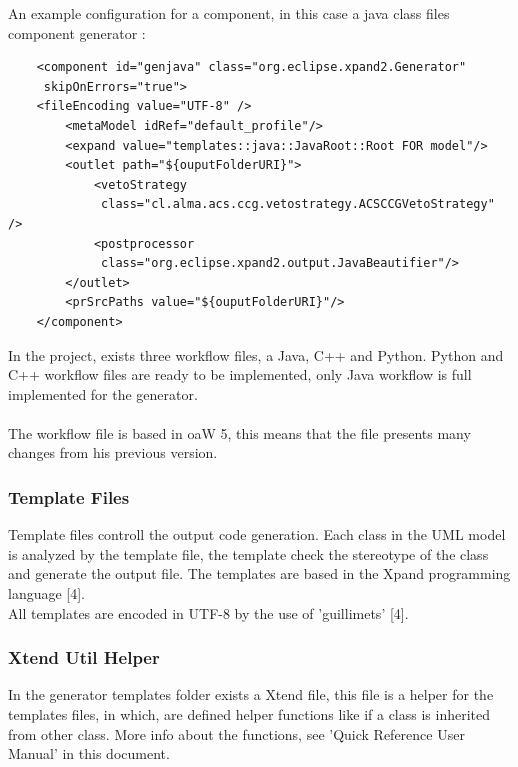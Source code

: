 An example configuration for a component, in this case a java class files
component generator :
\begin{center}
\begin{verbatim}
    <component id="genjava" class="org.eclipse.xpand2.Generator"
     skipOnErrors="true"> 
    <fileEncoding value="UTF-8" />
        <metaModel idRef="default_profile"/>
        <expand value="templates::java::JavaRoot::Root FOR model"/>
        <outlet path="${ouputFolderURI}">
            <vetoStrategy
             class="cl.alma.acs.ccg.vetostrategy.ACSCCGVetoStrategy" /> 
            <postprocessor 
             class="org.eclipse.xpand2.output.JavaBeautifier"/>
        </outlet>
        <prSrcPaths value="${ouputFolderURI}"/>
    </component> 
\end{verbatim}
\end{center}

In the project, exists three workflow files, a Java, C++ and Python. Python
and C++ workflow files are ready to be implemented, only Java workflow is full
implemented for the generator.\\
\\
The workflow file is based in oaW 5, this means that the file presents many
changes from his previous version.

\subsubsection{Template Files}
Template files controll the output code generation. Each class in the UML model
is analyzed by the template file, the template check the stereotype of the
class and generate the output file. The templates are based in the Xpand
programming language [4].\\
All templates are encoded in UTF-8 by the use of 'guillimets' [4].

\subsubsection{Xtend Util Helper}
In the generator templates folder exists a Xtend file, this file is a helper
for the templates files, in which, are defined helper functions like if a class
is inherited from other class. More info about the functions, see 'Quick
Reference User Manual' in this document.



